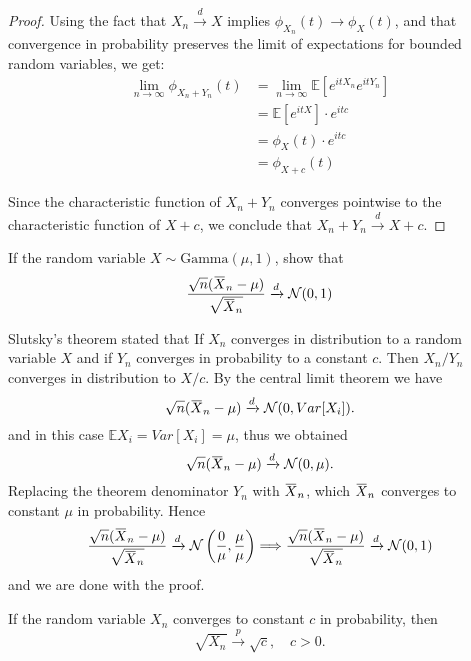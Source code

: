 \begin{proof}
    Using the fact that $X_n \xrightarrow{d} X$ implies $\phi_{X_n}(t) \to \phi_X(t)$, and that convergence in probability preserves the limit of expectations for bounded random variables, we get:
    \begin{align*}
        \lim_{n \to \infty} \phi_{X_n + Y_n}(t) &= \lim_{n \to \infty} \mathbb{E}[e^{itX_n}e^{itY_n}] \\
        &= \mathbb{E}[e^{itX}] \cdot e^{itc} \\
        &= \phi_X(t) \cdot e^{itc} \\
        &= \phi_{X + c}(t)
    \end{align*}
    
    Since the characteristic function of $X_n + Y_n$ converges pointwise to the characteristic function of $X + c$, we conclude that $X_n + Y_n \xrightarrow{d} X + c$.
\end{proof}

\begin{example}
    If the random variable $X \sim \text{Gamma}(\mu, 1)$, show that 
    \[
        \frac{\sqrt{n}(\ols{X}_n - \mu)}{\sqrt{\ols{X}_n}} \xrightarrow[]{d} \mathcal{N}(0,1)
    \]
\end{example}
\begin{solution}
    Slutsky's theorem stated that If $X_n$ converges in distribution to a random variable 
    $X$ and if $Y_n$ converges in probability to a constant $c$. Then $X_n / Y_n$
    converges in distribution to $X/c$. By the central limit theorem we have 
    \[
        \sqrt{n}(\ols{X}_n - \mu) \xrightarrow[]{d} \mathcal{N}(0, Var[X_i]).
    \]
    and in this case $\mathbb{E}X_i = Var[X_i] = \mu$, thus we obtained
    \[
        \sqrt{n}(\ols{X}_n - \mu) \xrightarrow[]{d} \mathcal{N}(0, \mu).
    \]
    Replacing the theorem denominator $Y_n$ with $\ols{X}_n$, which $\ols{X}_n$ converges to constant $\mu$ 
    in probability. Hence
    \[
        \frac{\sqrt{n}(\ols{X}_n - \mu)}{\sqrt{\ols{X}_n}} \xrightarrow[]{d} \mathcal{N}\left(\frac{0}{\mu}, \frac{\mu}{\mu}\right)
        \Longrightarrow \frac{\sqrt{n}(\ols{X}_n - \mu)}{\sqrt{\ols{X}_n}} \xrightarrow[]{d} \mathcal{N}(0,1)
    \]
    and we are done with the proof.
\end{solution}

\begin{theorem}
    If the random variable $X_n$ converges to constant $c$ in probability, then 
    \begin{equation}
        \sqrt{X_n} \xrightarrow[]{p} \sqrt{c},\quad c > 0. 
    \end{equation}
\end{theorem}

